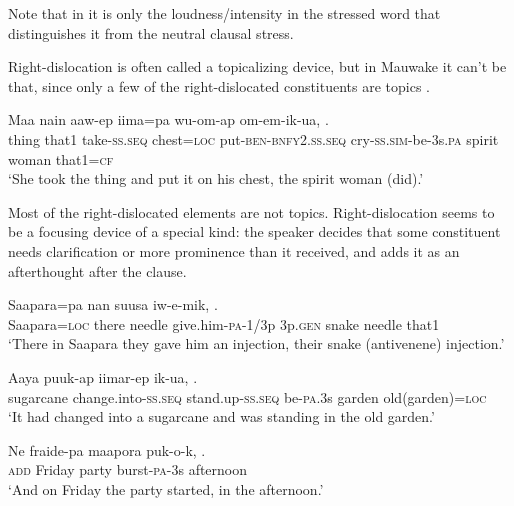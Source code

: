 Note that in  it is only the loudness/intensity in the stressed word that distinguishes it from the neutral clausal stress.

Right-dislocation is often called a topicalizing device, but in Mauwake it can't be that, since only a few of the right-dislocated constituents are topics . 

\ea%
\label{ex:x1745}
\gll Maa  nain  aaw-ep  iima=pa  wu-om-ap om-em-ik-ua,      .\\
thing  that1  take-\textsc{ss}.\textsc{seq}  chest=\textsc{loc} put-\textsc{ben}-\textsc{bnfy}2.\textsc{ss}.\textsc{seq} cry-\textsc{ss}.\textsc{sim}-be-3s.\textsc{pa}  spirit  woman  that1=\textsc{cf}\\
\glt`She took the thing and put it on his chest, the spirit woman (did).'
\z


Most of the right-dislocated elements are not topics. Right-dislocation seems to be a focusing device of a special kind: the speaker decides that some constituent needs clarification or more prominence than it received, and adds it as an afterthought after the clause.

\ea%
\label{ex:x1746}
\gll Saapara=pa  nan  suusa  iw-e-mik,     .\\
Saapara=\textsc{loc}  there  needle  give.him-\textsc{pa}-1/3p  3p.\textsc{gen}  snake needle  that1\\
\glt`There in Saapara they gave him an injection, their snake (antivenene) injection.'
\z


\ea%
\label{ex:x1747}
\gll Aaya puuk-ap iimar-ep ik-ua,   .\\
sugarcane  change.into-\textsc{ss}.\textsc{seq}  stand.up-\textsc{ss}.\textsc{seq} be-\textsc{pa}.3s garden  old(garden)=\textsc{loc}\\
\glt`It had changed into a sugarcane and was standing in the old garden.'
\z


\ea%
\label{ex:x1748}
\gll Ne  fraide-pa  maapora  puk-o-k,  .\\
\textsc{add}  Friday  party  burst-\textsc{pa}-3s  afternoon\\
\glt`And on Friday the party started, in the afternoon.'
\z
{}
